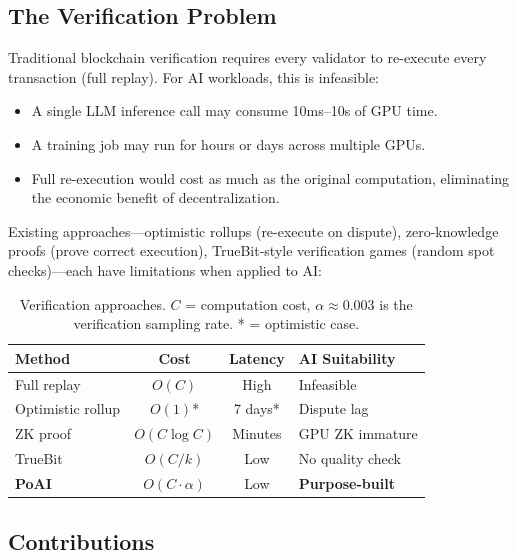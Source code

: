 \documentclass[11pt,twocolumn]{article}
\begin{document}
\subsection{The Verification Problem}

Traditional blockchain verification requires every validator to re-execute every transaction (full replay). For AI workloads, this is infeasible:

\begin{itemize}[leftmargin=1.1em]
    \item A single LLM inference call may consume 10ms--10s of GPU time.
    \item A training job may run for hours or days across multiple GPUs.
    \item Full re-execution would cost as much as the original computation, eliminating the economic benefit of decentralization.
\end{itemize}

Existing approaches---optimistic rollups (re-execute on dispute), zero-knowledge proofs (prove correct execution), TrueBit-style verification games (random spot checks)---each have limitations when applied to AI:

\begin{table}[H]
\centering
\small
\begin{tabular}{lccl}
\toprule
\textbf{Method} & \textbf{Cost} & \textbf{Latency} & \textbf{AI Suitability} \\
\midrule
Full replay & $O(C)$ & High & Infeasible \\
Optimistic rollup & $O(1)$* & 7 days* & Dispute lag \\
ZK proof & $O(C \log C)$ & Minutes & GPU ZK immature \\
TrueBit & $O(C/k)$ & Low & No quality check \\
\textbf{PoAI} & $O(C \cdot \alpha)$ & Low & \textbf{Purpose-built} \\
\bottomrule
\end{tabular}
\caption{Verification approaches. $C$ = computation cost, $\alpha \approx 0.003$ is the verification sampling rate. * = optimistic case.}
\label{tab:verification}
\end{table}

\subsection{Contributions}
\end{document}
